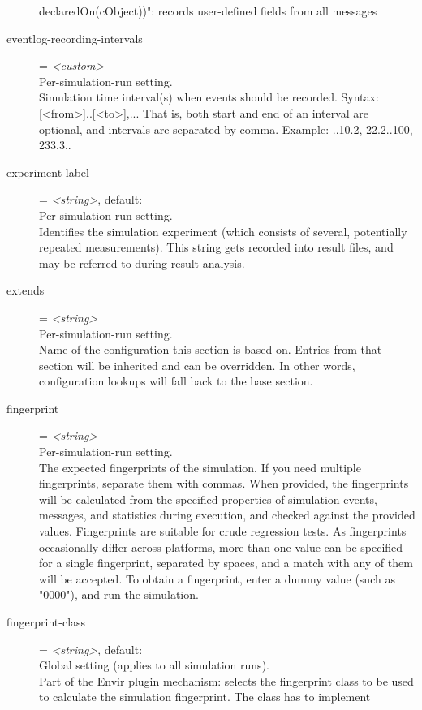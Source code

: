 \begin{description}
    declaredOn(cObject))": records user-defined fields from all messages
\item[eventlog-recording-intervals] = \textit{<custom>}\\
    Per-simulation-run setting.\\
    Simulation time interval(s) when events should be recorded. Syntax:
    [<from>]..[<to>],... That is, both start and end of an interval are
    optional, and intervals are separated by comma. Example: ..10.2, 22.2..100,
    233.3..
\item[experiment-label] = \textit{<string>}, default: \\
    Per-simulation-run setting.\\
    Identifies the simulation experiment (which consists of several,
    potentially repeated measurements). This string gets recorded into result
    files, and may be referred to during result analysis.
\item[extends] = \textit{<string>}\\
    Per-simulation-run setting.\\
    Name of the configuration this section is based on. Entries from that
    section will be inherited and can be overridden. In other words,
    configuration lookups will fall back to the base section.
\item[fingerprint] = \textit{<string>}\\
    Per-simulation-run setting.\\
    The expected fingerprints of the simulation. If you need multiple
    fingerprints, separate them with commas. When provided, the fingerprints
    will be calculated from the specified properties of simulation events,
    messages, and statistics during execution, and checked against the provided
    values. Fingerprints are suitable for crude regression tests. As
    fingerprints occasionally differ across platforms, more than one value can
    be specified for a single fingerprint, separated by spaces, and a match
    with any of them will be accepted. To obtain a fingerprint, enter a dummy
    value (such as "0000"), and run the simulation.
\item[fingerprint-class] = \textit{<string>}, default: \\
    Global setting (applies to all simulation runs).\\
    Part of the Envir plugin mechanism: selects the fingerprint class to be
    used to calculate the simulation fingerprint. The class has to implement

\end{description}
